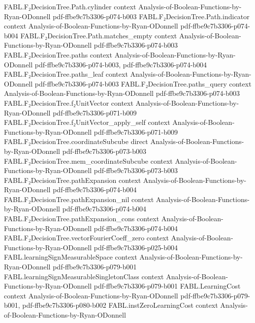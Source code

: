 \begin{theorem}
  {FABL.F₂DecisionTree.Path.cylinder}
  {context}
  {Analysis-of-Boolean-Functions-by-Ryan-ODonnell}
  {pdf-ffbe9c7b3306-p074-b003}
\proofstep
  {FABL.F₂DecisionTree.Path.indicator}
  {context}
  {Analysis-of-Boolean-Functions-by-Ryan-ODonnell}
  {pdf-ffbe9c7b3306-p074-b004}
\proofstep
  {FABL.F₂DecisionTree.Path.matches_empty}
  {context}
  {Analysis-of-Boolean-Functions-by-Ryan-ODonnell}
  {pdf-ffbe9c7b3306-p074-b003}
\proofstep
  {FABL.F₂DecisionTree.paths}
  {context}
  {Analysis-of-Boolean-Functions-by-Ryan-ODonnell}
  {pdf-ffbe9c7b3306-p074-b003,
    pdf-ffbe9c7b3306-p074-b004}
\proofstep
  {FABL.F₂DecisionTree.paths_leaf}
  {context}
  {Analysis-of-Boolean-Functions-by-Ryan-ODonnell}
  {pdf-ffbe9c7b3306-p074-b003}
\proofstep
  {FABL.F₂DecisionTree.paths_query}
  {context}
  {Analysis-of-Boolean-Functions-by-Ryan-ODonnell}
  {pdf-ffbe9c7b3306-p074-b003}
\proofstep
  {FABL.F₂DecisionTree.f₂UnitVector}
  {context}
  {Analysis-of-Boolean-Functions-by-Ryan-ODonnell}
  {pdf-ffbe9c7b3306-p071-b009}
\proofstep
  {FABL.F₂DecisionTree.f₂UnitVector_apply_self}
  {context}
  {Analysis-of-Boolean-Functions-by-Ryan-ODonnell}
  {pdf-ffbe9c7b3306-p071-b009}
\proofstep
  {FABL.F₂DecisionTree.coordinateSubcube}
  {direct}
  {Analysis-of-Boolean-Functions-by-Ryan-ODonnell}
  {pdf-ffbe9c7b3306-p073-b003}
\proofstep
  {FABL.F₂DecisionTree.mem_coordinateSubcube}
  {context}
  {Analysis-of-Boolean-Functions-by-Ryan-ODonnell}
  {pdf-ffbe9c7b3306-p073-b003}
\proofstep
  {FABL.F₂DecisionTree.pathExpansion}
  {context}
  {Analysis-of-Boolean-Functions-by-Ryan-ODonnell}
  {pdf-ffbe9c7b3306-p074-b004}
\proofstep
  {FABL.F₂DecisionTree.pathExpansion_nil}
  {context}
  {Analysis-of-Boolean-Functions-by-Ryan-ODonnell}
  {pdf-ffbe9c7b3306-p074-b004}
\proofstep
  {FABL.F₂DecisionTree.pathExpansion_cons}
  {context}
  {Analysis-of-Boolean-Functions-by-Ryan-ODonnell}
  {pdf-ffbe9c7b3306-p074-b004}
\proofstep
  {FABL.F₂DecisionTree.vectorFourierCoeff_zero}
  {context}
  {Analysis-of-Boolean-Functions-by-Ryan-ODonnell}
  {pdf-ffbe9c7b3306-p025-b004}
\proofstep
  {FABL.learningSignMeasurableSpace}
  {context}
  {Analysis-of-Boolean-Functions-by-Ryan-ODonnell}
  {pdf-ffbe9c7b3306-p079-b001}
\proofstep
  {FABL.learningSignMeasurableSingletonClass}
  {context}
  {Analysis-of-Boolean-Functions-by-Ryan-ODonnell}
  {pdf-ffbe9c7b3306-p079-b001}
\proofstep
  {FABL.LearningCost}
  {context}
  {Analysis-of-Boolean-Functions-by-Ryan-ODonnell}
  {pdf-ffbe9c7b3306-p079-b001,
    pdf-ffbe9c7b3306-p080-b002}
\proofstep
  {FABL.instZeroLearningCost}
  {context}
  {Analysis-of-Boolean-Functions-by-Ryan-ODonnell}

\end{theorem}
